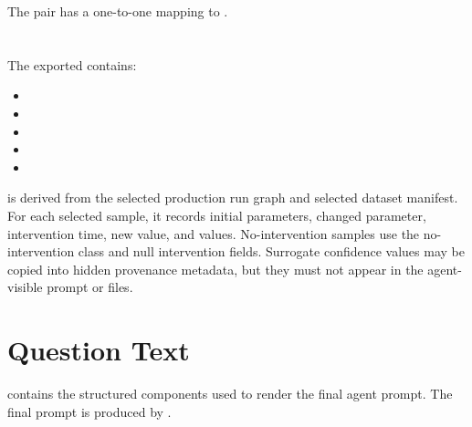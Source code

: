 \documentclass[11pt]{article}
\begin{document}
The pair  has a one-to-one mapping to .

\section*{\texorpdfstring{}{questions.json}}

The exported  contains:

\begin{itemize}
\item {}
\item {}
\item {}
\item {}
\item {}
\end{itemize}

 is derived from the selected production run graph and selected dataset manifest.
For each selected sample, it records initial parameters, changed parameter, intervention time, new value, and  values.
No-intervention samples use the no-intervention class and null intervention fields.
Surrogate confidence values may be copied into hidden provenance metadata, but they must not appear in the agent-visible prompt or files.

\section*{Question Text}
\label{sec:generate-question-question-text}

 contains the structured components used to render the final agent prompt.
The final prompt is produced by .
\end{document}
